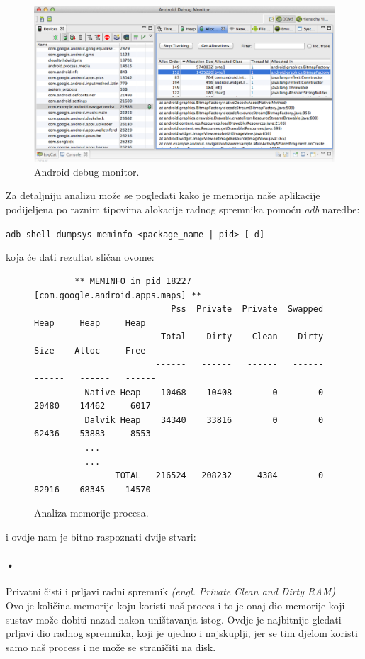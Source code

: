 \documentclass[times, utf8, zavrsni]{fer}
\begin{document}
\begin{figure}[ht!]
\centering
\includegraphics[width=140mm]{img/android-debug-monitor.png}
\caption{Android debug monitor.}
\label{overflow}
\end{figure}

Za detaljniju analizu može se pogledati kako je memorija naše aplikacije podijeljena po raznim tipovima alokacije radnog spremnika pomoću \textit{adb} naredbe:

\begin{center}
\verb=adb shell dumpsys meminfo <package_name | pid> [-d]=
\end{center}
koja će dati rezultat sličan ovome:

\begin{figure}[ht!]
\centering
\begingroup
    \fontsize{9pt}{12pt}\selectfont
		\begin{verbatim}
		** MEMINFO in pid 18227 [com.google.android.apps.maps] **
		                   Pss  Private  Private  Swapped     Heap     Heap     Heap
		                 Total    Dirty    Clean    Dirty     Size    Alloc     Free
		                ------   ------   ------   ------   ------   ------   ------
		  Native Heap    10468    10408        0        0    20480    14462     6017
		  Dalvik Heap    34340    33816        0        0    62436    53883     8553
		  ...
		  ...
		        TOTAL   216524   208232     4384        0    82916    68345    14570
\end{verbatim}
\endgroup
\caption{Analiza memorije procesa.}
\label{overflow}
\end{figure}

\noindent
i ovdje nam je bitno raspoznati dvije stvari:


\paragraph{•}
Privatni čisti i prljavi radni spremnik \textit{(engl. Private Clean and Dirty RAM)}\\
Ovo je količina memorije koju koristi naš proces i to je onaj dio memorije koji sustav može dobiti nazad nakon uništavanja istog. Ovdje je najbitnije gledati prljavi dio radnog spremnika, koji je ujedno i najskuplji, jer se tim djelom koristi samo naš process i ne može se straničiti na disk.
\end{document}
